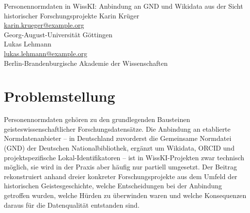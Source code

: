 \graphicspath{{abstracts/praesentationen/06-personennormdaten/img/}{img/}}

\begin{beitrag}{Personennormdaten in WissKI: Anbindung an GND und Wikidata aus der Sicht historischer Forschungsprojekte}{%
Karin Krüger\, \\
\small \href{mailto:karin.krueger@example.org}{karin.krueger@example.org} \\
\small Georg-August-Universität Göttingen \\[0.5cm]
Lukas Lehmann\, \\
\small \href{mailto:lukas.lehmann@example.org}{lukas.lehmann@example.org} \\
\small Berlin-Brandenburgische Akademie der Wissenschaften
}

\begin{abstract}
Der Beitrag untersucht anhand dreier historischer Forschungsprojekte die Strategien zur Anbindung von Personennormdaten (GND, Wikidata, ORCID) in WissKI: obligatorische GND-Pflicht, opportunistische lokale URIs und ein hybrider Ansatz -- mit je unterschiedlichen Konsequenzen für Erfassungsgeschwindigkeit und Datenqualität. Technisch wird die Anbindung über das erweiterte WissKI-Salz-Modul mit GND-Live-Suche realisiert; Wikidata-Einträge werden über eine regelmäßige SPARQL-Brücke abgeglichen. Die wichtigste Erkenntnis lautet, dass die Kombination aus GND und Wikidata die produktivste Strategie für die meisten Projekte darstellt, während lokale Normdaten-Stämme von Beginn an mit einer klaren Übergabestrategie geplant werden müssen.
\end{abstract}

\section{Problemstellung}
Personennormdaten gehören zu den grundlegenden Bausteinen geisteswissenschaftlicher Forschungsdatensätze. Die Anbindung an etablierte Normdatenanbieter -- in Deutschland zuvorderst die Gemeinsame Normdatei (GND) der Deutschen Nationalbibliothek, ergänzt um Wikidata, ORCID und projektspezifische Lokal-Identifikatoren -- ist in WissKI-Projekten zwar technisch möglich, sie wird in der Praxis aber häufig nur partiell umgesetzt. Der Beitrag rekonstruiert anhand dreier konkreter Forschungsprojekte aus dem Umfeld der historischen Geistesgeschichte, welche Entscheidungen bei der Anbindung getroffen wurden, welche Hürden zu überwinden waren und welche Konsequenzen daraus für die Datenqualität entstanden sind.


\end{beitrag}
